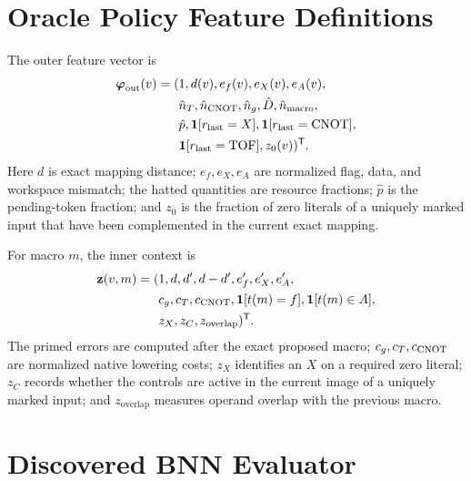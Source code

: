 \appendices

\section{Oracle Policy Feature Definitions}

The outer feature vector is
\begin{equation}
\begin{aligned}
\boldsymbol{\varphi}_{\mathrm{out}}(v)=(&1,d(v),e_f(v),e_X(v),e_A(v),\\
&\hat n_T,\hat n_{\operatorname{CNOT}},\hat n_g,\hat D,\hat n_{\mathrm{macro}},\\
&\hat p,\mathbf{1}[r_{\mathrm{last}}=X],\mathbf{1}[r_{\mathrm{last}}=\operatorname{CNOT}],\\
&\mathbf{1}[r_{\mathrm{last}}=\operatorname{TOF}],z_0(v))^\mathsf T.
\end{aligned}
\end{equation}
Here $d$ is exact mapping distance; $e_f,e_X,e_A$ are normalized flag, data, and workspace mismatch; the hatted quantities are resource fractions; $\hat p$ is the pending-token fraction; and $z_0$ is the fraction of zero literals of a uniquely marked input that have been complemented in the current exact mapping.

For macro $m$, the inner context is
\begin{equation}
\begin{aligned}
\mathbf{z}(v,m)=(&1,d,d',d-d',e_f',e_X',e_A',\\
&c_g,c_T,c_{\operatorname{CNOT}},\mathbf{1}[t(m)=f],\mathbf{1}[t(m)\in A],\\
&z_X,z_C,z_{\mathrm{overlap}})^\mathsf T.
\end{aligned}
\end{equation}
The primed errors are computed after the exact proposed macro; $c_g,c_T,c_{\operatorname{CNOT}}$ are normalized native lowering costs; $z_X$ identifies an $X$ on a required zero literal; $z_C$ records whether the controls are active in the current image of a uniquely marked input; and $z_{\mathrm{overlap}}$ measures operand overlap with the previous macro.

\section{Discovered BNN Evaluator}

